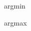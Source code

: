 \newcommand{\dif}[1][]{\mathop{}\!\mathrm{d}
  \if\relax\detokenize{#1}\relax
  \else
    ^{#1}\mkern-1.5mu
  \fi}

\ifcsname argmin\endcsname%
  \relax
\else%
  \DeclareMathOperator*{\argmin}{argmin}
\fi%

\ifcsname argmax\endcsname%
  \relax
\else%
  \DeclareMathOperator*{\argmax}{argmax}
\fi%


